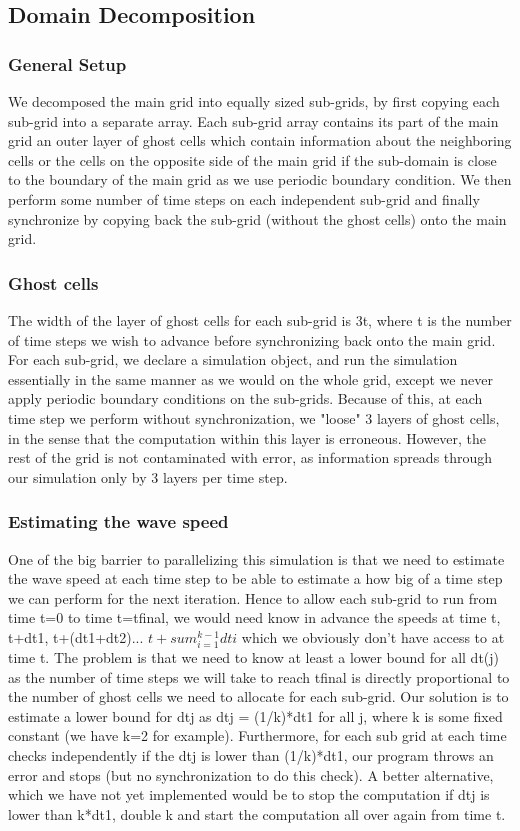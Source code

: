 \documentclass[11pt]{article}
\begin{document}
\subsection{Domain Decomposition}
\subsubsection{General Setup}
We decomposed the main grid into equally sized sub-grids, by first copying  each sub-grid into a separate array. Each sub-grid array contains its part of the main grid an outer layer of ghost cells which contain information about the neighboring cells or the cells on the opposite side of the main grid if the sub-domain is close to the boundary of the main grid as we use periodic boundary condition. We then perform some number of time steps on each independent sub-grid and finally synchronize by copying back the sub-grid (without the ghost cells) onto the main grid. 
\subsubsection{Ghost cells}

 The width of the layer of ghost cells for each sub-grid is 3t, where t is the number of time steps we wish to advance before synchronizing back onto the main grid. For each sub-grid, we declare a simulation object, and run the simulation essentially in the same manner as we would on the whole grid, except we never apply periodic boundary conditions on the sub-grids. Because of this, at each time step we perform without synchronization, we "loose" 3 layers of ghost cells, in the sense that the computation within this layer is erroneous. 
However, the rest of the grid is not contaminated with error, as information spreads through our simulation only by 3 layers per time step.

\subsubsection{Estimating the wave speed}
One of the big barrier to parallelizing this simulation is that we need to estimate the wave speed at each time step to be able to estimate a how big of a time step we can perform for the next iteration. Hence to allow each sub-grid to run from time t=0 to time t=tfinal, we would need know in advance the speeds at time t, t+dt1, t+(dt1+dt2)... $t+sum_{i=1}^{k-1}dti$ which we obviously don't have access to at time t. The problem is that we need to know at least a lower bound for all dt(j) as the number of time steps we will take to reach tfinal is directly proportional to the number of ghost cells we need to allocate for each sub-grid. Our solution is to estimate a lower bound for dtj as dtj = (1/k)*dt1 for all j, where k is some fixed constant (we have k=2 for example). Furthermore, for each sub grid at each time checks independently if the dtj is lower than (1/k)*dt1, our program throws an error and stops (but no synchronization to do this check). A better alternative, which we have not yet implemented would be to stop the computation if dtj is lower than k*dt1, double k and start the computation all over again from time t.
\end{document}
